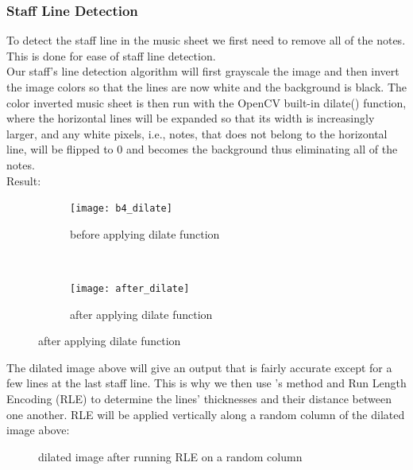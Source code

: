 \documentclass[a4paper,12pt]{report}
\begin{document}
\subsubsection{Staff Line Detection}
To detect the staff line in the music sheet we first need to remove all of the notes.
This is done for ease of staff line detection.\\

Our staff's line detection algorithm will first grayscale the image and then
invert the image colors so that the lines are now white and the background is
black. The color inverted music sheet is then run with the OpenCV built-in
dilate() function, where the horizontal lines will be expanded so that its width
is increasingly larger, and any white pixels, i.e., notes, that does not belong
to the horizontal line, will be flipped to 0 and becomes the background thus
eliminating all of the notes.\\

Result:
\begin{figure}[H]
    \centering
    \begin{subfigure}[t]{0.5\textwidth}
        \centering
        \texttt{[image: b4\_dilate]}
        \caption{before applying dilate function}
    \end{subfigure}%
    ~ 
    \begin{subfigure}[t]{0.5\textwidth}
        \centering
        \texttt{[image: after\_dilate]}
        \caption{after applying dilate function}
    \end{subfigure}
\end{figure}

The dilated image above will give an output that is fairly accurate except for a
few lines at the last staff line. This is why we then use \textcite{Gomez2017}'s
method and Run Length Encoding (RLE) to determine the lines' thicknesses and
their distance between one another. RLE will be applied vertically along a
random column of the dilated image above:\\

\begin{figure}[ht]
\caption{dilated image after running RLE on a random column \protect\footnotemark }
\label{}
\end{figure}

\end{document}

